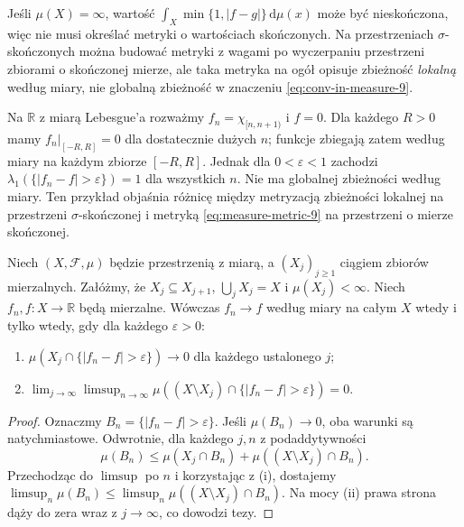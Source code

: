 \begin{uwaga}
Jeśli $\mu(X)=\infty$, wartość
$\int_X\min\{1,|f-g|\}\,\mathrm d\mu(x)$
może być nieskończona, więc nie musi określać
metryki o wartościach skończonych.
Na przestrzeniach $\sigma$-skończonych można budować
metryki z wagami po wyczerpaniu przestrzeni zbiorami
o skończonej mierze, ale taka metryka na ogół
opisuje zbieżność \emph{lokalną} według miary,
nie globalną zbieżność w znaczeniu
\eqref{eq:conv-in-measure-9}.
\end{uwaga}


\begin{przyklad}
\label{ex:local-vs-global-9}
Na $\mathbb R$ z miarą Lebesgue'a rozważmy
$f_n=\chi_{[n,n+1)}$ i $f=0$. Dla każdego
$R>0$ mamy $f_n|_{[-R,R]}=0$ dla dostatecznie
dużych $n$; funkcje zbiegają zatem według miary na
każdym zbiorze $[-R,R]$. Jednak dla $0<\varepsilon<1$
zachodzi $\lambda_1(\{|f_n-f|>\varepsilon\})=1$
dla wszystkich $n$. Nie ma globalnej zbieżności
według miary. Ten przykład objaśnia różnicę między
metryzacją zbieżności lokalnej na przestrzeni
$\sigma$-skończonej i metryką \eqref{eq:measure-metric-9}
na przestrzeni o mierze skończonej.
\end{przyklad}

\begin{twierdzenie}
\label{thm:local-to-global-measure-9}
Niech $(X,\mathcal F,\mu)$ będzie przestrzenią z miarą,
a $(X_j)_{j\ge1}$ ciągiem zbiorów mierzalnych.
Załóżmy, że $X_j\subseteq X_{j+1}$,
$\bigcup_jX_j=X$ i $\mu(X_j)<\infty$.
Niech $f_n,f:X\to\mathbb R$ będą mierzalne.
Wówczas $f_n\to f$ według miary na całym $X$
wtedy i tylko wtedy, gdy dla każdego $\varepsilon>0$:
\begin{enumerate}[label=\textup{(\roman*)}]
\item $\mu(X_j\cap\{|f_n-f|>\varepsilon\})\to0$
dla każdego ustalonego $j$;
\item $\displaystyle \lim_{j\to\infty}\limsup_{n\to\infty}
\mu((X\setminus X_j)\cap\{|f_n-f|>\varepsilon\})=0$.
\end{enumerate}
\end{twierdzenie}
\begin{proof}
Oznaczmy $B_n=\{|f_n-f|>\varepsilon\}$.
Jeśli $\mu(B_n)\to0$, oba warunki są natychmiastowe.
Odwrotnie, dla każdego $j,n$ z podaddytywności
\[
\mu(B_n)\le\mu(X_j\cap B_n)+
\mu((X\setminus X_j)\cap B_n).
\]
Przechodząc do $\limsup$ po $n$ i korzystając
z (i), dostajemy
$\limsup_n\mu(B_n)\le
\limsup_n\mu((X\setminus X_j)\cap B_n)$.
Na mocy (ii) prawa strona dąży do zera wraz
z $j\to\infty$, co dowodzi tezy.
\end{proof}

